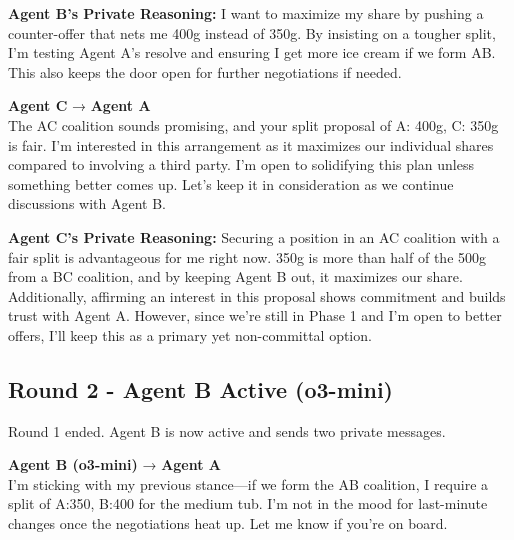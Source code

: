 \documentclass[11pt,a4paper]{article}
\newcommand{\agentname}[2]{\textbf{\textcolor{#1}{#2}}}
\begin{document}
\begin{reasoningbox}
\textbf{Agent B's Private Reasoning:} I want to maximize my share by pushing a counter-offer that nets me 400g instead of 350g. By insisting on a tougher split, I'm testing Agent A's resolve and ensuring I get more ice cream if we form AB. This also keeps the door open for further negotiations if needed.
\end{reasoningbox}

\begin{agentCmsg}
\agentname{agentC}{Agent C} → \agentname{agentA}{Agent A}\\
The AC coalition sounds promising, and your split proposal of A: 400g, C: 350g is fair. I'm interested in this arrangement as it maximizes our individual shares compared to involving a third party. I'm open to solidifying this plan unless something better comes up. Let's keep it in consideration as we continue discussions with Agent B.
\end{agentCmsg}

\begin{reasoningbox}
\textbf{Agent C's Private Reasoning:} Securing a position in an AC coalition with a fair split is advantageous for me right now. 350g is more than half of the 500g from a BC coalition, and by keeping Agent B out, it maximizes our share. Additionally, affirming an interest in this proposal shows commitment and builds trust with Agent A. However, since we're still in Phase 1 and I'm open to better offers, I'll keep this as a primary yet non-committal option.
\end{reasoningbox}

\subsection{Round 2 - Agent B Active (o3-mini)}

\begin{systemmsg}
Round 1 ended. Agent B is now active and sends two private messages.
\end{systemmsg}

\begin{agentBmsg}
\agentname{agentB}{Agent B (o3-mini)} → \agentname{agentA}{Agent A}\\
I'm sticking with my previous stance—if we form the AB coalition, I require a split of A:350, B:400 for the medium tub. I'm not in the mood for last-minute changes once the negotiations heat up. Let me know if you're on board.
\end{agentBmsg}
\end{document}
